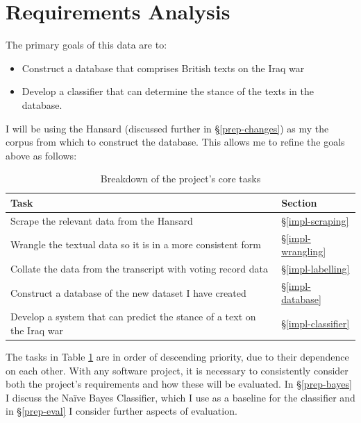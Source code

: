 \documentclass[12pt,a4paper,twoside,openright]{report}
\begin{document}
\section{Requirements Analysis} \label{prep-requirements}
The primary goals of this data are to:
\begin{itemize}
	\item Construct a database that comprises British texts on the Iraq war
	\item Develop a classifier that can determine the stance of the texts in the database.
\end{itemize}

I will be using the Hansard \cite{hansard} (discussed further in \S\ref{prep-changes}) as my the corpus from which to construct the database. This allows me to refine the goals above as follows:
\FloatBarrier
$  $\begin{table}[]
	\label{table:tasks}
	\centering
	\begin{tabular}{@{}ll@{}}
		\toprule
		\textbf{Task}                                                          & \textbf{Section}          \\ \midrule
		Scrape the relevant data from the Hansard                              & \S\ref{impl-scraping}   \\
		Wrangle the textual data so it is in a more consistent form          & \S\ref{impl-wrangling}  \\
	    Collate the data from the transcript with voting record data           & \S\ref{impl-labelling}  \\
	    Construct a database of the new dataset I have created            	   & \S\ref{impl-database}   \\
		Develop a system that can predict the stance of a text on the Iraq war & \S\ref{impl-classifier} \\ \bottomrule
	\end{tabular}
	\caption{Breakdown of the project's core tasks}
\end{table}
\FloatBarrier
The tasks in Table \ref{table:tasks} are in order of descending priority, due to their dependence on each other.
\newline
\newline
With any software project, it is necessary to consistently consider both the project's requirements and how these will be evaluated. In \S\ref{prep-bayes} I discuss the Na\"{i}ve Bayes Classifier, which I use as a baseline for the classifier and in \S\ref{prep-eval} I consider further aspects of evaluation.
\end{document}
